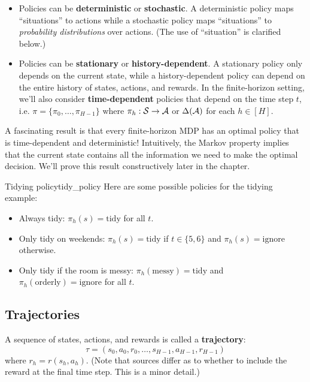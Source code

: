 \documentclass[../main/main]{subfiles}
\begin{document}
\begin{itemize}
    \item Policies can be \textbf{deterministic} or \textbf{stochastic}. A deterministic policy maps ``situations'' to actions while a stochastic policy maps ``situations'' to \emph{probability distributions} over actions. (The use of ``situation'' is clarified below.)
    \item Policies can be \textbf{stationary} or \textbf{history-dependent}. A stationary policy only depends on the current state, while a history-dependent policy can depend on the entire history of states, actions, and rewards. In the finite-horizon setting, we'll also consider \textbf{time-dependent} policies that depend on the time step $t$, i.e. $\pi = \{ \pi_0, \dots, \pi_{H-1} \}$ where $\pi_h : \mathcal{S} \to \mathcal{A}$ or $\Delta(\mathcal{A})$ for each $h \in [H]$.
\end{itemize}

A fascinating result is that every finite-horizon MDP has an optimal policy that is time-dependent and deterministic! Intuitively, the Markov property implies that the current state contains all the information we need to make the optimal decision. We'll prove this result constructively later in the chapter.


\begin{example}{Tidying policy}{tidy_policy}
    Here are some possible policies for the tidying example:

    \begin{itemize}
        \item Always tidy: $\pi_h(s) = \text{tidy}$ for all $t$.
        \item Only tidy on weekends: $\pi_h(s) = \text{tidy}$ if $t \in \{ 5, 6 \}$ and $\pi_h(s) = \text{ignore}$ otherwise.
        \item Only tidy if the room is messy: $\pi_h(\text{messy}) = \text{tidy}$ and $\pi_h(\text{orderly}) = \text{ignore}$ for all $t$.
    \end{itemize}
\end{example}

\subsection{Trajectories}

A sequence of states, actions, and rewards is called a \textbf{trajectory}:
\[
    \tau = (s_0, a_0, r_0, \dots, s_{H-1}, a_{H-1}, r_{H-1})
\]
where $r_h = r(s_h, a_h)$. (Note that sources differ as to whether to include the reward at the final time step. This is a minor detail.)
\end{document}
